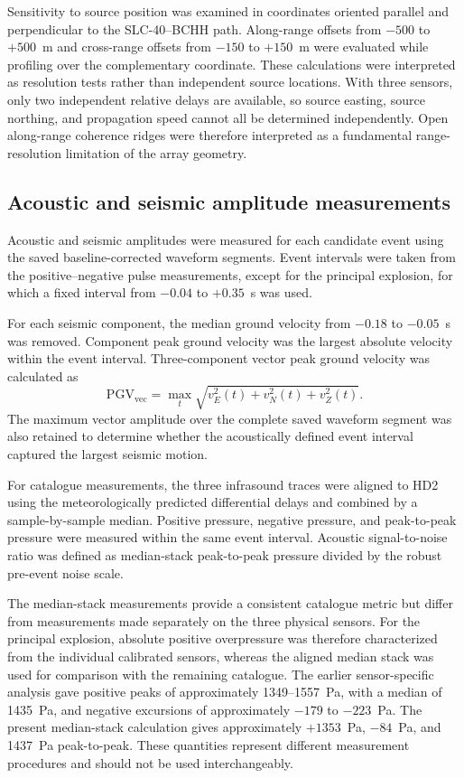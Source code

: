 \documentclass[]{seismica}
\begin{document}
Sensitivity to source position was examined in coordinates oriented parallel and perpendicular to the SLC-40--BCHH path. Along-range offsets from $-500$ to $+500$~m and cross-range offsets from $-150$ to $+150$~m were evaluated while profiling over the complementary coordinate. These calculations were interpreted as resolution tests rather than independent source locations. With three sensors, only two independent relative delays are available, so source easting, source northing, and propagation speed cannot all be determined independently. Open along-range coherence ridges were therefore interpreted as a fundamental range-resolution limitation of the array geometry.

\subsection{Acoustic and seismic amplitude measurements}

Acoustic and seismic amplitudes were measured for each candidate event using the saved baseline-corrected waveform segments. Event intervals were taken from the positive--negative pulse measurements, except for the principal explosion, for which a fixed interval from $-0.04$ to $+0.35$~s was used.

For each seismic component, the median ground velocity from $-0.18$ to $-0.05$~s was removed. Component peak ground velocity was the largest absolute velocity within the event interval. Three-component vector peak ground velocity was calculated as
\begin{equation}
  \mathrm{PGV}_{\mathrm{vec}} = \max_t\sqrt{v_E^2(t)+v_N^2(t)+v_Z^2(t)}.
  \label{eq:vector_pgv}
\end{equation}
The maximum vector amplitude over the complete saved waveform segment was also retained to determine whether the acoustically defined event interval captured the largest seismic motion.

For catalogue measurements, the three infrasound traces were aligned to HD2 using the meteorologically predicted differential delays and combined by a sample-by-sample median. Positive pressure, negative pressure, and peak-to-peak pressure were measured within the same event interval. Acoustic signal-to-noise ratio was defined as median-stack peak-to-peak pressure divided by the robust pre-event noise scale.

The median-stack measurements provide a consistent catalogue metric but differ from measurements made separately on the three physical sensors. For the principal explosion, absolute positive overpressure was therefore characterized from the individual calibrated sensors, whereas the aligned median stack was used for comparison with the remaining catalogue. The earlier sensor-specific analysis gave positive peaks of approximately 1349--1557~Pa, with a median of 1435~Pa, and negative excursions of approximately $-179$ to $-223$~Pa. The present median-stack calculation gives approximately $+1353$~Pa, $-84$~Pa, and 1437~Pa peak-to-peak. These quantities represent different measurement procedures and should not be used interchangeably.
\end{document}
